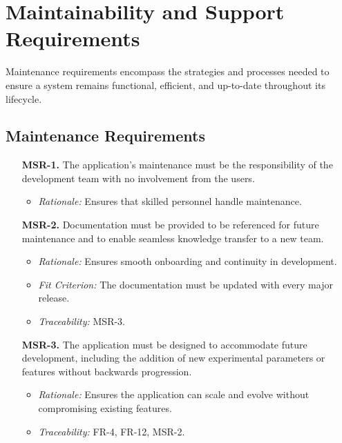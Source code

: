 \documentclass[12pt]{article}
\begin{document}
\section{Maintainability and Support Requirements}
Maintenance requirements encompass the strategies and processes needed to ensure
a system remains functional, efficient, and up-to-date throughout its lifecycle.

\subsection{Maintenance Requirements}
\begin{enumerate}
  \item[\textbf{MSR-1.}] The application’s maintenance must be the
  responsibility of the development team with no involvement from the users.
  \begin{itemize}
    \item \textit{Rationale:} Ensures that skilled personnel handle maintenance.
  \end{itemize}

  \item[\textbf{MSR-2.}] Documentation must be provided to be referenced for
  future maintenance and to enable seamless knowledge transfer to a new team.
  \begin{itemize}
    \item \textit{Rationale:} Ensures smooth onboarding and continuity in
    development.
    \item \textit{Fit Criterion:} The documentation must be updated with every
    major release.
    \item \textit{Traceability:} MSR-3.
  \end{itemize}

  \item[\textbf{MSR-3.}] The application must be designed to accommodate future
  development, including the addition of new experimental parameters or features
  without backwards progression.
  \begin{itemize}
    \item \textit{Rationale:} Ensures the application can scale and evolve
    without compromising existing features.
    \item \textit{Traceability:} FR-4, FR-12, MSR-2.
  \end{itemize}
\end{enumerate}
\end{document}

